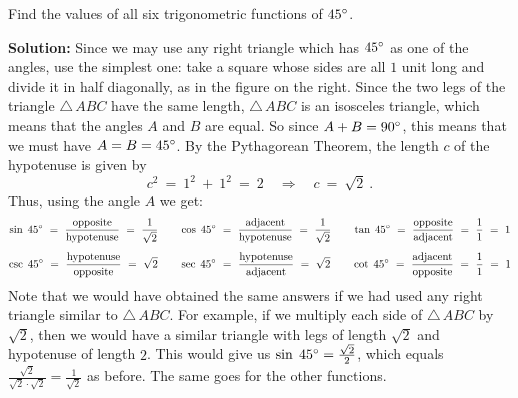 \begin{exmp}\label{exmp:funcs45}
\noindent Find the values of all six trigonometric functions of $45^\circ$.\vspace{1mm}
 \par\noindent\textbf{Solution:} Since we may use any right triangle which has $45^\circ$ as one of
 the angles, use the simplest one: take a square whose sides are all $1$ unit long and divide it
 in half diagonally, as in the figure on the right. Since the two legs of the triangle
 $\triangle\,ABC$ have the same length, $\triangle\,ABC$ is an isosceles triangle, which means
 that the angles $A$ and $B$ are equal. So since $A + B = 90^\circ$, this means that we must have
 $A = B = 45^\circ$. By the Pythagorean Theorem, the length $c$ of the hypotenuse is given by
 \begin{displaymath}
  c^2 ~=~ 1^2 ~+~ 1^2 ~=~ 2 \quad\Rightarrow\quad c ~=~ \sqrt{2} ~.
 \end{displaymath}
 Thus, using the angle $A$ we get:
 \begin{displaymath}
  \sin\;45\Degrees ~=~ \dfrac{\text{opposite}}{\text{hypotenuse}} ~=~ \dfrac{1}{\sqrt{2}} \quad\quad
  \cos\;45\Degrees ~=~ \dfrac{\text{adjacent}}{\text{hypotenuse}} ~=~ \dfrac{1}{\sqrt{2}} \quad\quad
  \tan\;45\Degrees ~=~ \dfrac{\text{opposite}}{\text{adjacent}} ~=~ \dfrac{1}{1} ~=~ 1\vspace{2mm}
 \end{displaymath}
 \begin{displaymath}
  \csc\;45\Degrees ~=~ \dfrac{\text{hypotenuse}}{\text{opposite}} ~=~ \sqrt{2} \quad\quad
  \sec\;45\Degrees ~=~ \dfrac{\text{hypotenuse}}{\text{adjacent}} ~=~ \sqrt{2} \quad\quad
  \cot\;45\Degrees ~=~ \dfrac{\text{adjacent}}{\text{opposite}} ~=~ \dfrac{1}{1} ~=~ 1\vspace{2mm}
 \end{displaymath}
 Note that we would have obtained the same answers if we had used any right triangle similar to
 $\triangle\,ABC$. For example, if we multiply each side of $\triangle\,ABC$ by $\sqrt{2}$, then
 we would have a similar triangle with legs of length $\sqrt{2}$ and hypotenuse of length $2$. This
 would give us $\sin\;45^\circ = \frac{\sqrt{2}}{2}$, which equals
 $\frac{\sqrt{2}}{\sqrt{2} \cdot \sqrt{2}} = \frac{1}{\sqrt{2}}$ as before. The same goes for
 the other functions.
\end{exmp}\vspace{-2mm}
